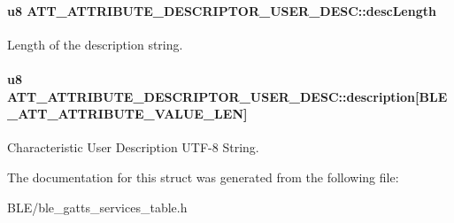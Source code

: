 \paragraph[{\texorpdfstring{desc\+Length}{descLength}}]{\setlength{\rightskip}{0pt plus 5cm}u8 A\+T\+T\+\_\+\+A\+T\+T\+R\+I\+B\+U\+T\+E\+\_\+\+D\+E\+S\+C\+R\+I\+P\+T\+O\+R\+\_\+\+U\+S\+E\+R\+\_\+\+D\+E\+S\+C\+::desc\+Length}\hypertarget{struct_a_t_t___a_t_t_r_i_b_u_t_e___d_e_s_c_r_i_p_t_o_r___u_s_e_r___d_e_s_c_af0ddadc1c8c5b55547ee1c131ae34fe7}{}\label{struct_a_t_t___a_t_t_r_i_b_u_t_e___d_e_s_c_r_i_p_t_o_r___u_s_e_r___d_e_s_c_af0ddadc1c8c5b55547ee1c131ae34fe7}
Length of the description string. 
\paragraph[{\texorpdfstring{description}{description}}]{\setlength{\rightskip}{0pt plus 5cm}u8 A\+T\+T\+\_\+\+A\+T\+T\+R\+I\+B\+U\+T\+E\+\_\+\+D\+E\+S\+C\+R\+I\+P\+T\+O\+R\+\_\+\+U\+S\+E\+R\+\_\+\+D\+E\+S\+C\+::description\mbox{[}{\bf B\+L\+E\+\_\+\+A\+T\+T\+\_\+\+A\+T\+T\+R\+I\+B\+U\+T\+E\+\_\+\+V\+A\+L\+U\+E\+\_\+\+L\+EN}\mbox{]}}\hypertarget{struct_a_t_t___a_t_t_r_i_b_u_t_e___d_e_s_c_r_i_p_t_o_r___u_s_e_r___d_e_s_c_abfdcc57fdcf553e38eb41bb53b88714c}{}\label{struct_a_t_t___a_t_t_r_i_b_u_t_e___d_e_s_c_r_i_p_t_o_r___u_s_e_r___d_e_s_c_abfdcc57fdcf553e38eb41bb53b88714c}
Characteristic User Description U\+T\+F-\/8 String. 

The documentation for this struct was generated from the following file\+:\begin{DoxyCompactItemize}
\item 
B\+L\+E/ble\+\_\+gatts\+\_\+services\+\_\+table.\+h\end{DoxyCompactItemize}
